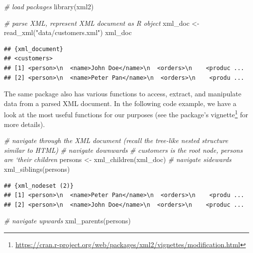 \documentclass[
  12pt,
]{style/krantz}
\newenvironment{Shaded}{\begin{snugshade}}{\end{snugshade}}
\newcommand{\CommentTok}[1]{\textcolor[rgb]{0.56,0.35,0.01}{\textit{#1}}}
\newcommand{\FunctionTok}[1]{\textcolor[rgb]{0.00,0.00,0.00}{#1}}
\newcommand{\NormalTok}[1]{#1}
\newcommand{\OtherTok}[1]{\textcolor[rgb]{0.56,0.35,0.01}{#1}}
\newcommand{\StringTok}[1]{\textcolor[rgb]{0.31,0.60,0.02}{#1}}
\renewcommand{\href}[2]{#2\footnote{\url{#1}}}
\begin{document}
\begin{Shaded}
\begin{Highlighting}[]
\CommentTok{\# load packages}
\FunctionTok{library}\NormalTok{(xml2)}

\CommentTok{\# parse XML, represent XML document as R object}
\NormalTok{xml\_doc }\OtherTok{\textless{}{-}} \FunctionTok{read\_xml}\NormalTok{(}\StringTok{"data/customers.xml"}\NormalTok{)}
\NormalTok{xml\_doc}
\end{Highlighting}
\end{Shaded}

\begin{verbatim}
## {xml_document}
## <customers>
## [1] <person>\n  <name>John Doe</name>\n  <orders>\n    <produc ...
## [2] <person>\n  <name>Peter Pan</name>\n  <orders>\n    <produ ...
\end{verbatim}

The same package also has various functions to access, extract, and manipulate data from a parsed XML document. In the following code example, we have a look at the most useful functions for our purposes (see the package's \href{https://cran.r-project.org/web/packages/xml2/vignettes/modification.html}{vignette} for more details).

\begin{Shaded}
\begin{Highlighting}[]
\CommentTok{\# navigate through the XML document (recall the tree{-}like nested structure similar to HTML)}
\CommentTok{\# navigate downwards}
\CommentTok{\# \textquotesingle{}customers\textquotesingle{} is the root node, persons are ‘their children\textquotesingle{}}
\NormalTok{persons }\OtherTok{\textless{}{-}} \FunctionTok{xml\_children}\NormalTok{(xml\_doc)}
\CommentTok{\# navigate sidewards}
\FunctionTok{xml\_siblings}\NormalTok{(persons)}
\end{Highlighting}
\end{Shaded}

\begin{verbatim}
## {xml_nodeset (2)}
## [1] <person>\n  <name>Peter Pan</name>\n  <orders>\n    <produ ...
## [2] <person>\n  <name>John Doe</name>\n  <orders>\n    <produc ...
\end{verbatim}

\begin{Shaded}
\begin{Highlighting}[]
\CommentTok{\# navigate upwards}
\FunctionTok{xml\_parents}\NormalTok{(persons)}
\end{Highlighting}
\end{Shaded}
\end{document}
